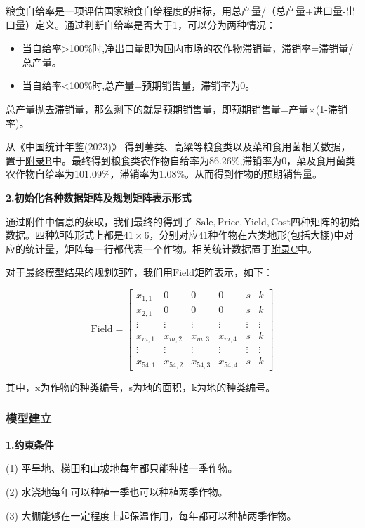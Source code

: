\documentclass{cumcmthesis}
\begin{document}
粮食自给率是一项评估国家粮食自给程度的指标，用总产量/（总产量+进口量-出口量）定义。通过判断自给率是否大于1，可以分为两种情况：

\begin{itemize}
	\item 	当自给率>100\%时,净出口量即为国内市场的农作物滞销量，滞销率=滞销量/总产量。
	\item 	当自给率<100\%时,总产量=预期销售量，滞销率为0。
\end{itemize}

总产量抛去滞销量，那么剩下的就是预期销售量，即预期销售量=产量$\times$(1-滞销率)。

从《中国统计年鉴(2023)》	得到薯类、高粱等粮食类以及菜和食用菌相关数据\cite{bib:one}，置于\underline{附录B}中。最终得到粮食类农作物自给率为86.26\%,滞销率为0，菜及食用菌类农作物自给率为101.09\%，滞销率为1.08\%。从而得到作物的预期销售量。

\textbf{2.初始化各种数据矩阵及规划矩阵表示形式}

通过附件中信息的获取，我们最终的得到了	$\text{Sale},\text{Price},\text{Yield},\text{Cost}$四种矩阵的初始数据。四种矩阵形式上都是$41 \times 6$，分别对应41种作物在六类地形(包括大棚)中对应的统计量，矩阵每一行都代表一个作物。相关统计数据置于\underline{附录C}中。

对于最终模型结果的规划矩阵，我们用$\text{Field}$矩阵表示，如下：

$$
\text{Field}=
\begin{bmatrix}
	x_{1,1}  &0   &0  &0  &s  &k \\
	x_{2,1}  &0   &0  &0  &s  &k \\
	\vdots  &\vdots  &\vdots  &\vdots  &\vdots  &\vdots \\
	x_{m,1}&  x_{m,2}& x_{m,3} &x_{m,4}  & s & k\\
	\vdots &  \vdots & \vdots  &  \vdots &  \vdots & \vdots \\
	x_{54,1}&  x_{54,2}& x_{54,3} & x_{54,4} &s  &k
\end{bmatrix}
$$


其中，x为作物的种类编号，s为地的面积，k为地的种类编号。
\subsubsection{模型建立}
\textbf{1.约束条件}


	(1) 平旱地、梯田和山坡地每年都只能种植一季作物。
	
	(2) 水浇地每年可以种植一季也可以种植两季作物。
	
	(3) 大棚能够在一定程度上起保温作用，每年都可以种植两季作物。
	
\end{document}
